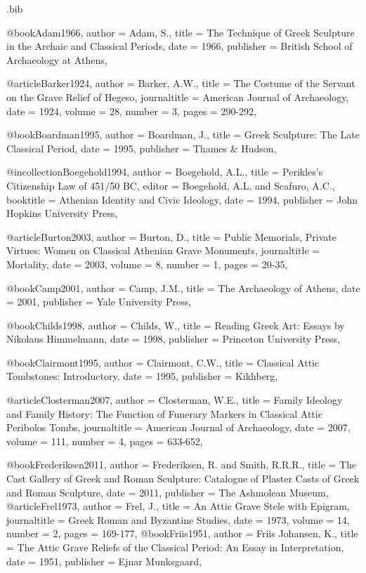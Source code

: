 \begin{filecontents}{\IJSRAidentifier.bib}

	@book{Adam1966,
		author = {Adam, S.},
		title = {The Technique of Greek Sculpture in the Archaic and Classical Periods},
		date = {1966},
		publisher = {British School of Archaeology at Athens},
	}

	@article{Barker1924,
		author = {Barker, A.W.},
		title = {The Costume of the Servant on the Grave Relief of Hegeso},
		journaltitle = {American Journal of Archaeology},
		date = {1924},
		volume = {28},
		number = {3},
		pages = {290-292},
	}

	@book{Boardman1995,
		author = {Boardman, J.},
		title = {Greek Sculpture: The Late Classical Period},
		date = {1995},
		publisher = {Thames \& Hudson},
	}

	@incollection{Boegehold1994,
		author = {Boegehold, A.L.},
		title = {Perikles’s Citizenship Law of 451/50 BC},
		editor = {Boegehold, A.L. and Scafuro, A.C.},
		booktitle = {Athenian Identity and Civic Ideology},
		date = {1994},
		publisher = {John Hopkins University Press},
	}

	@article{Burton2003,
		author = {Burton, D.},
		title = {Public Memorials, Private Virtues: Women on Classical Athenian Grave Monuments},
		journaltitle = {Mortality},
		date = {2003},
		volume = {8},
		number = {1},
		pages = {20-35},
	}

	@book{Camp2001,
		author = {Camp, J.M.},
		title = {The Archaeology of Athens},
		date = {2001},
		publisher = {Yale University Press},
	}

	@book{Childs1998,
		author = {Childs, W.},
		title = {Reading Greek Art: Essays by Nikolaus Himmelmann},
		date = {1998},
		publisher = {Princeton University Press},
	}

	@book{Clairmont1995,
		author = {Clairmont, C.W.},
		title = {Classical Attic Tombstones: Introductory},
		date = {1995},
		publisher = {Kikhberg},
	}

	@article{Closterman2007,
		author = {Closterman, W.E.},
		title = {Family Ideology and Family History: The Function of Funerary Markers in Classical Attic Peribolos Tombs},
		journaltitle = {American Journal of Archaeology},
		date = {2007},
		volume = {111},
		number = {4},
		pages = {633-652},
	}

	@book{Frederiksen2011,
		author = {Frederiksen, R. and Smith, R.R.R.},
		title = {The Cast Gallery of Greek and Roman Sculpture: Catalogue of Plaster Casts of Greek and Roman Sculpture},
		date = {2011},
		publisher = {The Ashmolean Museum},
	}
	@article{Frel1973,
	author = {Frel, J.},
	title = {An Attic Grave Stele with Epigram},
	journaltitle = {Greek Roman and Byzantine Studies},
	date = {1973},
	volume = {14},
	number = {2},
	pages = {169-177},
}
	@book{Friis1951,
		author = {Friis Johansen, K.},
		title = {The Attic Grave Reliefs of the Classical Period: An Essay in Interpretation},
		date = {1951},
		publisher = {Ejnar Munksgaard},
	}


\end{filecontents}

